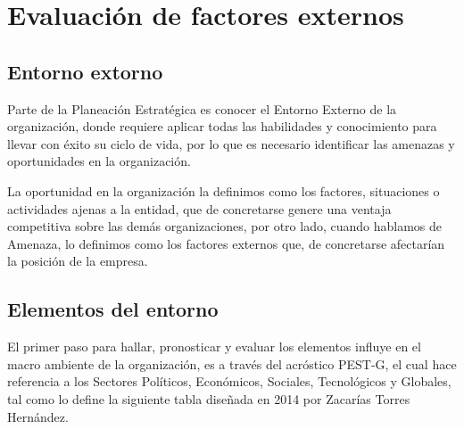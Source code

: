 \section{Evaluación de factores externos}
\subsection{Entorno extorno}
Parte de la Planeación Estratégica es conocer el Entorno Externo de la organización, donde requiere aplicar todas las habilidades y conocimiento para llevar con éxito su ciclo de vida, por lo que es necesario identificar las amenazas y oportunidades en la organización.

La oportunidad en la organización la definimos como los factores, situaciones o actividades ajenas a la entidad, que de concretarse genere una ventaja competitiva sobre las demás organizaciones, por otro lado, cuando hablamos de Amenaza, lo definimos como los factores externos que, de concretarse afectarían la posición de la empresa. 

\subsection{Elementos del entorno}
El primer paso para hallar, pronosticar y evaluar los elementos influye en el macro ambiente de la organización, es a través del acróstico PEST-G, el cual hace referencia a los Sectores Políticos, Económicos, Sociales, Tecnológicos y Globales, tal como lo define la siguiente tabla diseñada en 2014 por Zacarías Torres Hernández. \newpage

